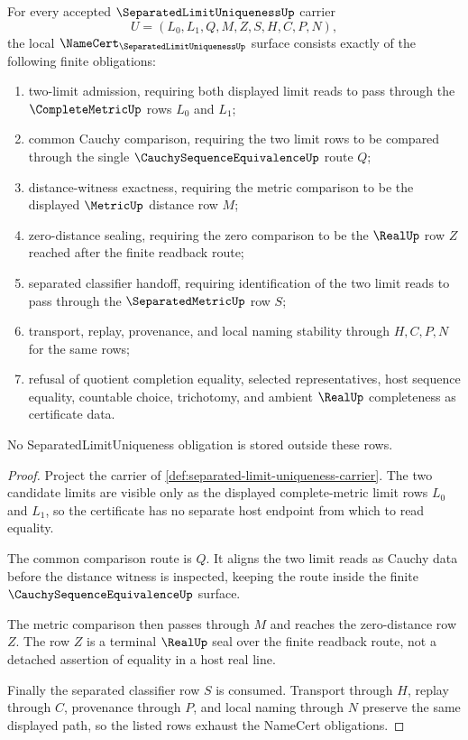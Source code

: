 \begin{theorem}\label{thm:separated-limit-uniqueness-namecert-obligations}
For every accepted $\SeparatedLimitUniquenessUp$ carrier
$$
U=(L_{0},L_{1},Q,M,Z,S,H,C,P,N),
$$
the local $\NameCert_{\SeparatedLimitUniquenessUp}$ surface consists exactly of the following finite obligations:
\begin{enumerate}
\item two-limit admission, requiring both displayed limit reads to pass through the $\CompleteMetricUp$ rows $L_{0}$ and $L_{1}$;
\item common Cauchy comparison, requiring the two limit rows to be compared through the single $\CauchySequenceEquivalenceUp$ route $Q$;
\item distance-witness exactness, requiring the metric comparison to be the displayed $\MetricUp$ distance row $M$;
\item zero-distance sealing, requiring the zero comparison to be the $\RealUp$ row $Z$ reached after the finite readback route;
\item separated classifier handoff, requiring identification of the two limit reads to pass through the $\SeparatedMetricUp$ row $S$;
\item transport, replay, provenance, and local naming stability through $H,C,P,N$ for the same rows;
\item refusal of quotient completion equality, selected representatives, host sequence equality, countable choice, trichotomy, and ambient $\RealUp$ completeness as certificate data.
\end{enumerate}
No SeparatedLimitUniqueness obligation is stored outside these rows.
\end{theorem}
\begin{proof}
Project the carrier of \autoref{def:separated-limit-uniqueness-carrier}. The two candidate limits are visible only as the displayed complete-metric limit rows $L_{0}$ and $L_{1}$, so the certificate has no separate host endpoint from which to read equality.

The common comparison route is $Q$. It aligns the two limit reads as Cauchy data before the distance witness is inspected, keeping the route inside the finite $\CauchySequenceEquivalenceUp$ surface.

The metric comparison then passes through $M$ and reaches the zero-distance row $Z$. The row $Z$ is a terminal $\RealUp$ seal over the finite readback route, not a detached assertion of equality in a host real line.

Finally the separated classifier row $S$ is consumed. Transport through $H$, replay through $C$, provenance through $P$, and local naming through $N$ preserve the same displayed path, so the listed rows exhaust the NameCert obligations.
\end{proof}

